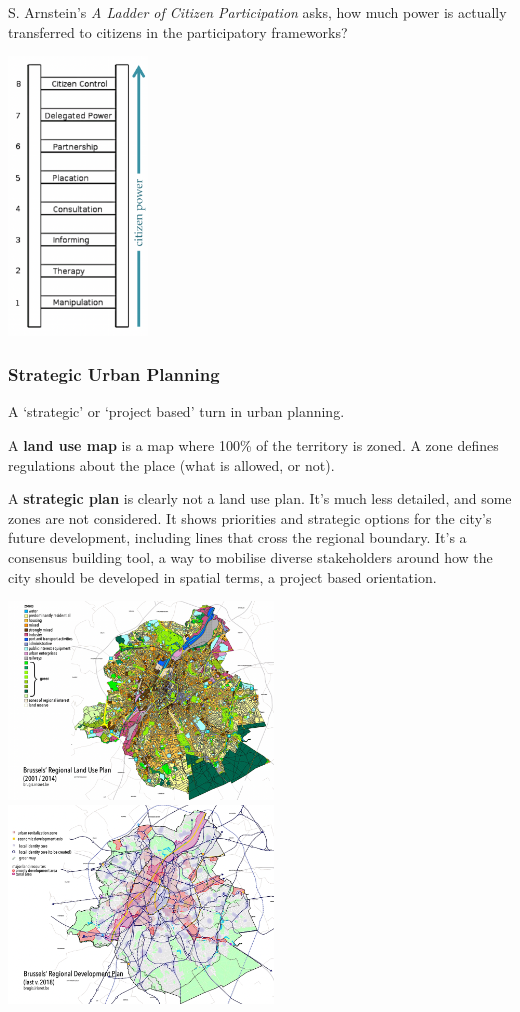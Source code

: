 \documentclass{article}
\begin{document}
S. Arnstein's \textit{A Ladder of Citizen Participation} asks, how much power is actually transferred to citizens in the participatory frameworks?

\begin{center}
\includegraphics[width=10em]{citizen_participation}
\end{center}

\subsubsection{Strategic Urban Planning}

A `strategic' or `project based' turn in urban planning.

A \textbf{land use map} is a map where 100\% of the territory is zoned. A zone defines regulations about the place (what is allowed, or not).

A \textbf{strategic plan} is clearly not a land use plan. It's much less detailed, and some zones are not considered. It shows priorities and strategic options for the city's future development, including lines that cross the regional boundary. It's a consensus building tool, a way to mobilise diverse stakeholders around how the city should be developed in spatial terms, a project based orientation.

\begin{center}
\includegraphics[width=19em]{land_use}
\includegraphics[width=19em]{strategic_plan}
\end{center}
\end{document}
